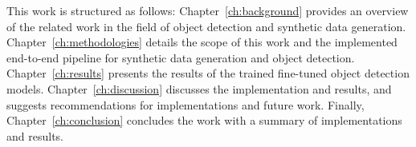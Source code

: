This work is structured as follows: Chapter~\ref{ch:background} provides an overview of the related work in the field of object detection and synthetic data generation. Chapter~\ref{ch:methodologies} details the scope of this work and the implemented end-to-end pipeline for synthetic data generation and object detection. Chapter~\ref{ch:results} presents the results of the trained fine-tuned object detection models. Chapter~\ref{ch:discussion} discusses the implementation and results, and suggests recommendations for implementations and future work. Finally, Chapter~\ref{ch:conclusion} concludes the work with a summary of implementations and results.








